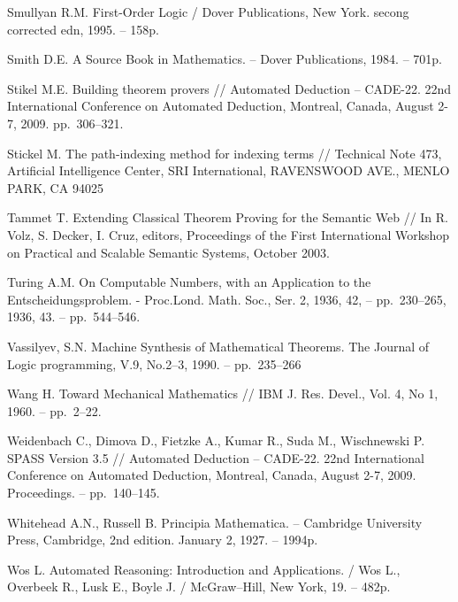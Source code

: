 \begin{thebibliography}{99}
 Smullyan R.M. First-Order Logic / Dover Publications, New York. secong corrected edn, 1995. -- 158p.

 Smith D.E. A Source Book in Mathematics. -- Dover Publications, 1984. -- 701p.


 Stikel M.E. Building theorem provers // Automated Deduction – CADE-22. 22nd International Conference on Automated Deduction, Montreal, Canada, August 2-7, 2009. pp.~306--321.

 Stickel M. The path-indexing method for indexing terms // Technical Note 473, Artificial Intelligence Center, SRI International, RAVENSWOOD AVE., MENLO PARK, CA 94025

 Tammet T. Extending Classical Theorem Proving for the Semantic Web // In R. Volz, S. Decker, I. Cruz, editors, Proceedings of the First International Workshop on Practical and Scalable Semantic Systems, October 2003.

 Turing A.M. On Computable Numbers, with an Application to the Entscheidungsproblem. - Proc.Lond. Math. Soc., Ser. 2, 1936, 42, -- pp.~230--265, 1936, 43. -- pp.~544--546.

 Vassilyev, S.N. Machine Synthesis of Mathematical Theorems. The Journal of Logic programming, V.9, No.2--3, 1990. -- pp.~235--266

 Wang H. Toward Mechanical Mathematics // IBM J. Res. Devel., Vol. 4, No 1, 1960. -- pp.~2--22.

 Weidenbach C., Dimova D., Fietzke A., Kumar R., Suda M., Wischnewski P. SPASS Version 3.5 // Automated Deduction – CADE-22. 22nd International Conference on Automated Deduction, Montreal, Canada, August 2-7, 2009. Proceedings. -- pp.~140--145.

 Whitehead A.N., Russell B. Principia Mathematica. -- Cambridge University Press, Cambridge, 2nd edition. January 2, 1927. -- 1994p.

 Wos L. Automated Reasoning: Introduction and Applications. / Wos L., Overbeek R., Lusk E.,  Boyle J. / McGraw--Hill,  New York, 19. -- 482p.


\end{thebibliography}
